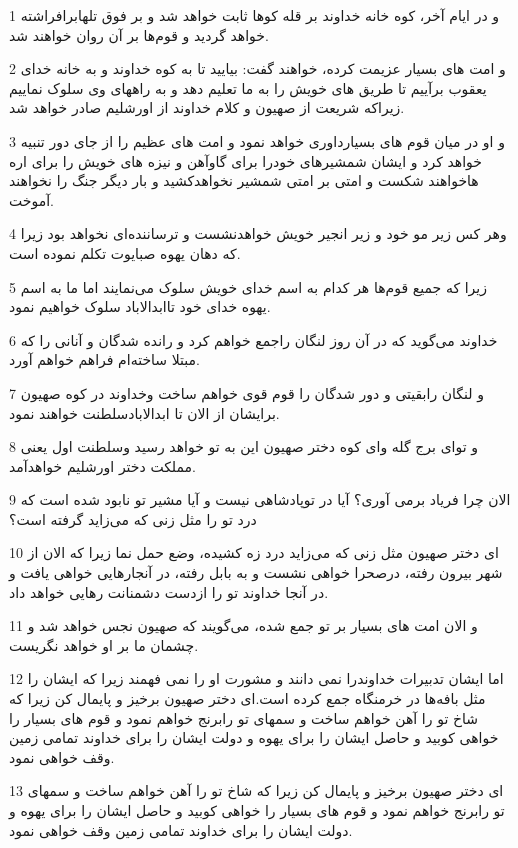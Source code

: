 \par 1 و در ایام آخر، کوه خانه خداوند بر قله کوها ثابت خواهد شد و بر فوق تلهابرافراشته خواهد گردید و قوم‌ها بر آن روان خواهند شد.
\par 2 و امت های بسیار عزیمت کرده، خواهند گفت: بیایید تا به کوه خداوند و به خانه خدای یعقوب برآییم تا طریق های خویش را به ما تعلیم دهد و به راههای وی سلوک نماییم زیراکه شریعت از صهیون و کلام خداوند از اورشلیم صادر خواهد شد.
\par 3 و او در میان قوم های بسیارداوری خواهد نمود و امت های عظیم را از جای دور تنبیه خواهد کرد و ایشان شمشیرهای خودرا برای گاوآهن و نیزه های خویش را برای اره هاخواهند شکست و امتی بر امتی شمشیر نخواهدکشید و بار دیگر جنگ را نخواهند آموخت.
\par 4 وهر کس زیر مو خود و زیر انجیر خویش خواهدنشست و ترساننده‌ای نخواهد بود زیرا که دهان یهوه صبایوت تکلم نموده است.
\par 5 زیرا که جمیع قوم‌ها هر کدام به اسم خدای خویش سلوک می‌نمایند اما ما به اسم یهوه خدای خود تاابدالاباد سلوک خواهیم نمود.
\par 6 خداوند می‌گوید که در آن روز لنگان راجمع خواهم کرد و رانده شدگان و آنانی را که مبتلا ساخته‌ام فراهم خواهم آورد.
\par 7 و لنگان رابقیتی و دور شدگان را قوم قوی خواهم ساخت وخداوند در کوه صهیون برایشان از الان تا ابدالابادسلطنت خواهند نمود.
\par 8 و تو‌ای برج گله و‌ای کوه دختر صهیون این به تو خواهد رسید وسلطنت اول یعنی مملکت دختر اورشلیم خواهدآمد.
\par 9 الان چرا فریاد برمی آوری؟ آیا در توپادشاهی نیست و آیا مشیر تو نابود شده است که درد تو را مثل زنی که می‌زاید گرفته است؟
\par 10 ‌ای دختر صهیون مثل زنی که می‌زاید درد زه کشیده، وضع حمل نما زیرا که الان از شهر بیرون رفته، درصحرا خواهی نشست و به بابل رفته، در آنجارهایی خواهی یافت و در آنجا خداوند تو را ازدست دشمنانت رهایی خواهد داد.
\par 11 و الان امت های بسیار بر تو جمع شده، می‌گویند که صهیون نجس خواهد شد و چشمان ما بر او خواهد نگریست.
\par 12 اما ایشان تدبیرات خداوندرا نمی دانند و مشورت او را نمی فهمند زیرا که ایشان را مثل بافه‌ها در خرمنگاه جمع کرده است.‌ای دختر صهیون برخیز و پایمال کن زیرا که شاخ تو را آهن خواهم ساخت و سمهای تو رابرنج خواهم نمود و قوم های بسیار را خواهی کوبید و حاصل ایشان را برای یهوه و دولت ایشان را برای خداوند تمامی زمین وقف خواهی نمود.
\par 13 ‌ای دختر صهیون برخیز و پایمال کن زیرا که شاخ تو را آهن خواهم ساخت و سمهای تو رابرنج خواهم نمود و قوم های بسیار را خواهی کوبید و حاصل ایشان را برای یهوه و دولت ایشان را برای خداوند تمامی زمین وقف خواهی نمود.

